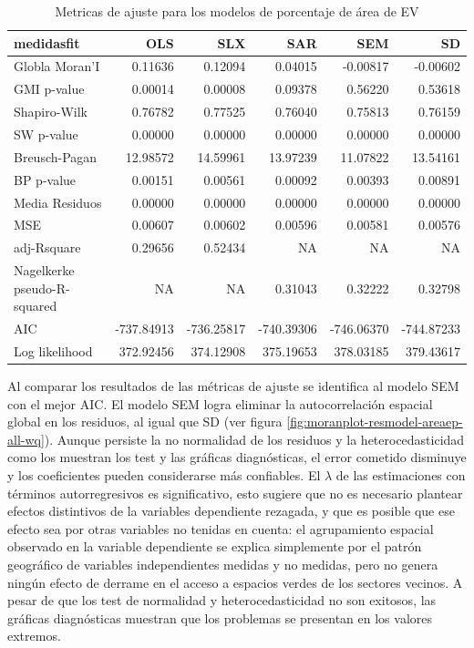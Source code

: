 \documentclass[12pt,]{book}
\begin{document}
\begin{table}

\caption{\label{tab:tabla-comp-modelos-areaep}Metricas de ajuste para los modelos de porcentaje de área de EV}
\centering
\begin{tabular}[t]{l|r|r|r|r|r}
\hline
medidasfit & OLS & SLX & SAR & SEM & SD\\
\hline
Globla Moran'I & 0.11636 & 0.12094 & 0.04015 & -0.00817 & -0.00602\\
\hline
GMI p-value & 0.00014 & 0.00008 & 0.09378 & 0.56220 & 0.53618\\
\hline
Shapiro-Wilk & 0.76782 & 0.77525 & 0.76040 & 0.75813 & 0.76159\\
\hline
SW p-value & 0.00000 & 0.00000 & 0.00000 & 0.00000 & 0.00000\\
\hline
Breusch-Pagan & 12.98572 & 14.59961 & 13.97239 & 11.07822 & 13.54161\\
\hline
BP p-value & 0.00151 & 0.00561 & 0.00092 & 0.00393 & 0.00891\\
\hline
Media Residuos & 0.00000 & 0.00000 & 0.00000 & 0.00000 & 0.00000\\
\hline
MSE & 0.00607 & 0.00602 & 0.00596 & 0.00581 & 0.00576\\
\hline
adj-Rsquare & 0.29656 & 0.52434 & NA & NA & NA\\
\hline
Nagelkerke pseudo-R-squared & NA & NA & 0.31043 & 0.32222 & 0.32798\\
\hline
AIC & -737.84913 & -736.25817 & -740.39306 & -746.06370 & -744.87233\\
\hline
Log likelihood & 372.92456 & 374.12908 & 375.19653 & 378.03185 & 379.43617\\
\hline
\end{tabular}
\end{table}

Al comparar los resultados de las métricas de ajuste se identifica al
modelo SEM con el mejor AIC. El modelo SEM logra eliminar la
autocorrelación espacial global en los residuos, al igual que SD (ver
figura \ref{fig:moranplot-resmodel-areaep-all-wq}). Aunque persiste la
no normalidad de los residuos y la heterocedasticidad como los muestran
los test y las gráficas diagnósticas, el error cometido disminuye y los
coeficientes pueden considerarse más confiables. El \(\lambda\) de las
estimaciones con términos autorregresivos es significativo, esto sugiere
que no es necesario plantear efectos distintivos de la variables
dependiente rezagada, y que es posible que ese efecto sea por otras
variables no tenidas en cuenta: el agrupamiento espacial observado en la
variable dependiente se explica simplemente por el patrón geográfico de
variables independientes medidas y no medidas, pero no genera ningún
efecto de derrame en el acceso a espacios verdes de los sectores
vecinos. A pesar de que los test de normalidad y heterocedasticidad no
son exitosos, las gráficas diagnósticas muestran que los problemas se
presentan en los valores extremos.
\end{document}
